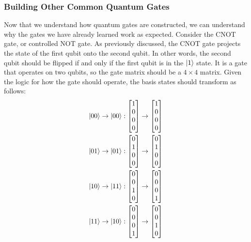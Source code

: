 \documentclass{article}
\begin{document}
\subsubsection{Building Other Common Quantum Gates}
\label{sec:buildingcommongates}
Now that we understand how quantum gates are constructed, we can understand why the gates we have already learned work as expected.
Consider the CNOT gate, or controlled NOT gate.
As previously discussed, the CNOT gate projects the state of the first qubit onto the second qubit.
In other words, the second qubit should be flipped if and only if the first qubit is in the $\ket{1}$ state.
It is a gate that operates on two qubits, so the gate matrix should be a $4 \times 4$ matrix.
Given the logic for how the gate should operate, the basis states should transform as follows:
\begin{align*}
	\ket{00} \rightarrow \ket{00} :
	\begin{bmatrix}
		1 \\
		0 \\
		0 \\
		0
	\end{bmatrix}
	\rightarrow
	\begin{bmatrix}
		1 \\
		0 \\
		0 \\
		0
	\end{bmatrix}
	\\
	\ket{01} \rightarrow \ket{01} :
	\begin{bmatrix}
		0 \\
		1 \\
		0 \\
		0
	\end{bmatrix}
	\rightarrow
	\begin{bmatrix}
		0 \\
		1 \\
		0 \\
		0
	\end{bmatrix}
	\\
	\ket{10} \rightarrow \ket{11} :
	\begin{bmatrix}
		0 \\
		0 \\
		1 \\
		0
	\end{bmatrix}
	\rightarrow
	\begin{bmatrix}
		0 \\
		0 \\
		0 \\
		1
	\end{bmatrix}
	\\
	\ket{11} \rightarrow \ket{10} :
	\begin{bmatrix}
		0 \\
		0 \\
		0 \\
		1
	\end{bmatrix}
	\rightarrow
	\begin{bmatrix}
		0 \\
		0 \\
		1 \\
		0
	\end{bmatrix}
\end{align*}
\end{document}
